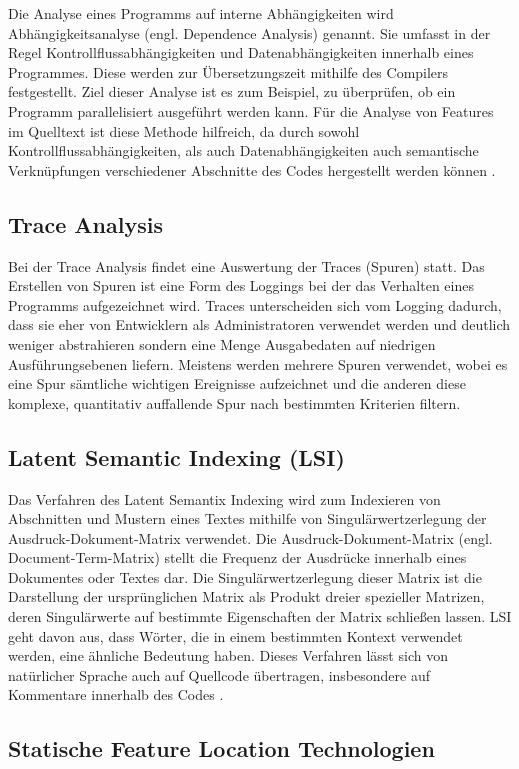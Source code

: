 \documentclass[runningheads,a4paper]{llncs}
\begin{document}
Die Analyse eines Programms auf interne Abhängigkeiten wird Abhängigkeitsanalyse (engl. Dependence Analysis) genannt. Sie umfasst in der Regel Kontrollflussabhängigkeiten und Datenabhängigkeiten innerhalb eines Programmes. Diese werden zur Übersetzungszeit mithilfe des Compilers festgestellt. Ziel dieser Analyse ist es zum Beispiel, zu überprüfen, ob ein Programm parallelisiert ausgeführt werden kann. Für die Analyse von Features im Quelltext ist diese Methode hilfreich, da durch sowohl Kontrollflussabhängigkeiten, als auch Datenabhängigkeiten auch semantische Verknüpfungen verschiedener Abschnitte des Codes hergestellt werden können \cite{PDA}.

\subsection*{Trace Analysis}
Bei der Trace Analysis findet eine Auswertung der Traces (Spuren) statt. Das Erstellen von Spuren ist eine Form des Loggings bei der das Verhalten eines Programms aufgezeichnet wird. Traces unterscheiden sich vom Logging dadurch, dass sie eher von Entwicklern als Administratoren verwendet werden und deutlich weniger abstrahieren sondern eine Menge Ausgabedaten auf niedrigen Ausführungsebenen liefern. Meistens werden mehrere Spuren verwendet, wobei es eine Spur sämtliche wichtigen Ereignisse aufzeichnet und die anderen diese komplexe, quantitativ auffallende Spur nach bestimmten Kriterien filtern. 

\subsection*{Latent Semantic Indexing (LSI)}

Das Verfahren des Latent Semantix Indexing wird zum Indexieren von Abschnitten und Mustern eines Textes mithilfe von Singulärwertzerlegung der Ausdruck-Dokument-Matrix verwendet. Die Ausdruck-Dokument-Matrix (engl. Document-Term-Matrix) stellt die Frequenz der Ausdrücke innerhalb eines Dokumentes oder Textes dar. Die Singulärwertzerlegung dieser Matrix ist die Darstellung der ursprünglichen Matrix als Produkt dreier spezieller Matrizen, deren Singulärwerte auf bestimmte Eigenschaften der Matrix schließen lassen. LSI geht davon aus, dass Wörter, die in einem bestimmten Kontext verwendet werden, eine ähnliche Bedeutung haben. Dieses Verfahren lässt sich von natürlicher Sprache auch auf Quellcode übertragen, insbesondere auf Kommentare innerhalb des Codes \cite{LSI}.

\subsection{Statische Feature Location Technologien}
\end{document}
